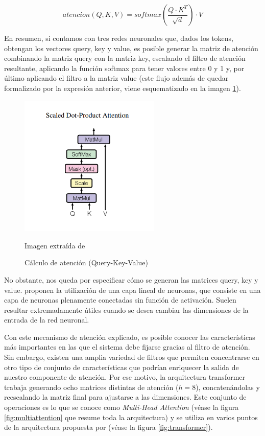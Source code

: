 $$
atencion(Q, K, V)=softmax\left(\frac{Q\cdot K^T}{\sqrt{d}}\right)\cdot V
$$

En resumen, si contamos con tres redes neuronales que, dados los tokens, obtengan los vectores query, key y value, es posible generar la matriz de atención combinando la matriz query con la matriz key, escalando el filtro de atención resultante, aplicando la función softmax para tener valores entre 0 y 1 y, por último aplicando el filtro a la matriz value (este flujo además de quedar formalizado por la expresión anterior, viene esquematizado en la imagen \ref{fig:qkv}).

\begin{figure}[h]
	\centering%
	\centerline{\includegraphics[width = 0.6\textwidth]{Imagenes/Bitmap/scaled-attention.png}}%
	\caption{Cálculo de atención (Query-Key-Value)}%
	Imagen extraída de \cite{transformers}
	\label{fig:qkv}
\end{figure}

No obstante, nos queda por especificar cómo se generan las matrices query, key y value. \cite{transformers} proponen la utilización de una capa lineal de neuronas, que consiste en una capa de neuronas plenamente conectadas sin función de activación. Suelen resultar extremadamente útiles cuando se desea cambiar las dimensiones de la entrada de la red neuronal.

Con este mecanismo de atención explicado, es posible conocer las características más importantes en las que el sistema debe fijarse gracias al filtro de atención. Sin embargo, existen una amplia variedad de filtros que permiten concentrarse en otro tipo de conjunto de características que podrían enriquecer la salida de nuestro componente de atención. Por ese motivo, la arquitectura transformer trabaja generando ocho matrices distintas de atención ($h = 8$), concatenándolas y reescalando la matriz final para ajustarse a las dimensiones. Este conjunto de operaciones es lo que se conoce como \textit{Multi-Head Attention} (véase la figura \ref{fig:multiattention} que resume toda la arquitectura) y se utiliza en varios puntos de la arquitectura propuesta por \cite{transformers} (véase la figura \ref{fig:transformer}).

